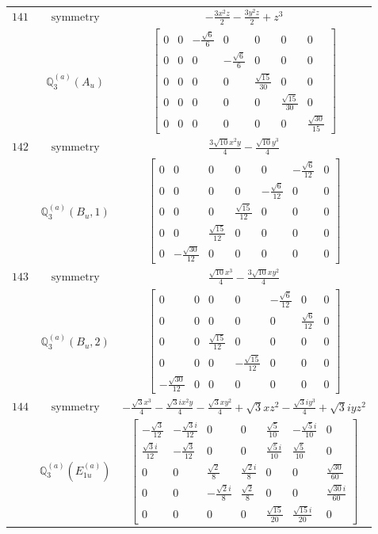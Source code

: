 \documentclass[fleqn,8pt,landscape]{jsarticle}
\begin{document}
\begin{longtable}{ccc}
$ 141 $ & $ \text{symmetry} $ & $ - \frac{3 x^{2} z}{2} - \frac{3 y^{2} z}{2} + z^{3} $ \\
$  $ & $ \mathbb{Q}_{3}^{(a)}(A_{u}) $ & $ \begin{bmatrix} 0 & 0 & - \frac{\sqrt{6}}{6} & 0 & 0 & 0 & 0 \\ 0 & 0 & 0 & - \frac{\sqrt{6}}{6} & 0 & 0 & 0 \\ 0 & 0 & 0 & 0 & \frac{\sqrt{15}}{30} & 0 & 0 \\ 0 & 0 & 0 & 0 & 0 & \frac{\sqrt{15}}{30} & 0 \\ 0 & 0 & 0 & 0 & 0 & 0 & \frac{\sqrt{30}}{15} \end{bmatrix} $ \\ \hline
$ 142 $ & $ \text{symmetry} $ & $ \frac{3 \sqrt{10} x^{2} y}{4} - \frac{\sqrt{10} y^{3}}{4} $ \\
$  $ & $ \mathbb{Q}_{3}^{(a)}(B_{u},1) $ & $ \begin{bmatrix} 0 & 0 & 0 & 0 & 0 & - \frac{\sqrt{6}}{12} & 0 \\ 0 & 0 & 0 & 0 & - \frac{\sqrt{6}}{12} & 0 & 0 \\ 0 & 0 & 0 & \frac{\sqrt{15}}{12} & 0 & 0 & 0 \\ 0 & 0 & \frac{\sqrt{15}}{12} & 0 & 0 & 0 & 0 \\ 0 & - \frac{\sqrt{30}}{12} & 0 & 0 & 0 & 0 & 0 \end{bmatrix} $ \\ \hline
$ 143 $ & $ \text{symmetry} $ & $ \frac{\sqrt{10} x^{3}}{4} - \frac{3 \sqrt{10} x y^{2}}{4} $ \\
$  $ & $ \mathbb{Q}_{3}^{(a)}(B_{u},2) $ & $ \begin{bmatrix} 0 & 0 & 0 & 0 & - \frac{\sqrt{6}}{12} & 0 & 0 \\ 0 & 0 & 0 & 0 & 0 & \frac{\sqrt{6}}{12} & 0 \\ 0 & 0 & \frac{\sqrt{15}}{12} & 0 & 0 & 0 & 0 \\ 0 & 0 & 0 & - \frac{\sqrt{15}}{12} & 0 & 0 & 0 \\ - \frac{\sqrt{30}}{12} & 0 & 0 & 0 & 0 & 0 & 0 \end{bmatrix} $ \\ \hline
$ 144 $ & $ \text{symmetry} $ & $ - \frac{\sqrt{3} x^{3}}{4} - \frac{\sqrt{3} i x^{2} y}{4} - \frac{\sqrt{3} x y^{2}}{4} + \sqrt{3} x z^{2} - \frac{\sqrt{3} i y^{3}}{4} + \sqrt{3} i y z^{2} $ \\
$  $ & $ \mathbb{Q}_{3}^{(a)}(E_{1u}^{(a)}) $ & $ \begin{bmatrix} - \frac{\sqrt{3}}{12} & - \frac{\sqrt{3} i}{12} & 0 & 0 & \frac{\sqrt{5}}{10} & - \frac{\sqrt{5} i}{10} & 0 \\ \frac{\sqrt{3} i}{12} & - \frac{\sqrt{3}}{12} & 0 & 0 & \frac{\sqrt{5} i}{10} & \frac{\sqrt{5}}{10} & 0 \\ 0 & 0 & \frac{\sqrt{2}}{8} & \frac{\sqrt{2} i}{8} & 0 & 0 & \frac{\sqrt{30}}{60} \\ 0 & 0 & - \frac{\sqrt{2} i}{8} & \frac{\sqrt{2}}{8} & 0 & 0 & \frac{\sqrt{30} i}{60} \\ 0 & 0 & 0 & 0 & \frac{\sqrt{15}}{20} & \frac{\sqrt{15} i}{20} & 0 \end{bmatrix} $ \\ \hline

\end{longtable}
\end{document}
